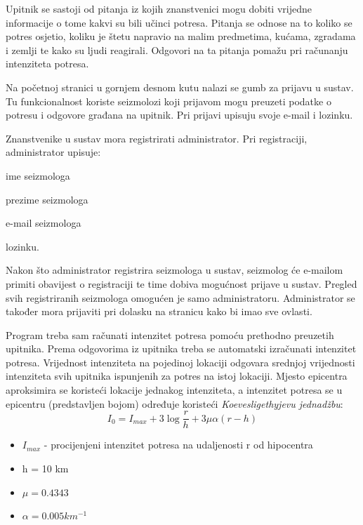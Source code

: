 {	Upitnik se sastoji od pitanja iz kojih znanstvenici mogu dobiti vrijedne informacije o tome kakvi su bili učinci potresa. 
	Pitanja se odnose na to koliko se potres osjetio, koliku je štetu napravio na malim predmetima, kućama, zgradama i zemlji te kako su ljudi reagirali. 
	Odgovori na ta pitanja pomažu pri računanju intenziteta potresa.
	
	Na početnoj stranici u gornjem desnom kutu nalazi se gumb za prijavu u sustav. Tu funkcionalnost koriste seizmolozi koji prijavom mogu preuzeti podatke o potresu i odgovore građana na upitnik.  Pri prijavi upisuju svoje e-mail i lozinku.
	 
	Znanstvenike u sustav mora registrirati administrator. Pri registraciji, administrator upisuje:
	\begin{packed_item}
		\item ime seizmologa
		\item prezime seizmologa
		\item e-mail seizmologa
		\item lozinku.
	\end{packed_item}
	Nakon što administrator registrira seizmologa u sustav, seizmolog će e-mailom primiti obavijest o registraciji te time dobiva mogućnost prijave u sustav.
	Pregled svih registriranih seizmologa omogućen je samo administratoru.
	Administrator se također mora prijaviti pri dolasku na stranicu kako bi imao sve ovlasti. \\
	
	}
	
	Program treba sam računati intenzitet potresa pomoću prethodno preuzetih upitnika. Prema odgovorima iz upitnika treba se automatski izračunati intenzitet potresa. 
	Vrijednost intenziteta na pojedinoj lokaciji odgovara srednjoj vrijednosti intenziteta svih upitnika ispunjenih za potres na istoj lokaciji. Mjesto epicentra aproksimira se koristeći lokacije jednakog intenziteta, a intenzitet potresa se u epicentru (predstavljen bojom) određuje koristeći \textit{Koevesligethyjevu jednadžbu}:
\begin{equation}
  I_{0} = I_{max} + 3\log\frac{r}{h} + 3\mu\alpha(r-h)
\end{equation}

\begin{itemize}                                                             
    \item $I_{max}$ - procijenjeni intenzitet potresa na udaljenosti r od hipocentra
    \item h = 10 km 
    \item $\mu=0.4343$
    \item $\alpha=0.005 km^{-1}$
    
\end{itemize} 


